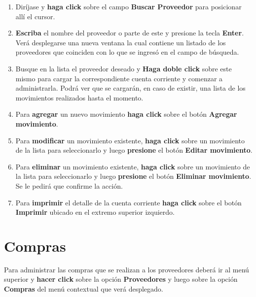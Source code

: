 \documentclass{book}
\begin{document}
\begin{enumerate}
	\itemsep=8pt \topsep=0pt \partopsep=0pt \parskip=0pt \parsep=0pt
	
	\item Diríjase y \textbf{haga click} sobre el campo \textbf{Buscar Proveedor} para posicionar allí el cursor.

	\item \textbf{Escriba} el nombre del proveedor o parte de este y presione la tecla \textbf{Enter}. Verá desplegarse una nueva ventana la cual contiene un listado de los proveedores que coinciden con lo que se ingresó en el campo de búsqueda.

	\item Busque en la lista el proveedor deseado y \textbf{Haga doble click} sobre este mismo para cargar la correspondiente cuenta corriente y comenzar a administrarla. Podrá ver que se cargarán, en caso de existir, una lista de los movimientos realizados hasta el momento.

	\item Para \textbf{agregar} un nuevo movimiento \textbf{haga click} sobre el botón \textbf{Agregar movimiento}.

	\item Para \textbf{modificar} un movimiento existente, \textbf{haga click} sobre un movimiento de la lista para seleccionarlo y luego \textbf{presione} el botón \textbf{Editar movimiento}.

	\item Para \textbf{eliminar} un movimiento existente, \textbf{haga click} sobre un movimiento de la lista para seleccionarlo y luego \textbf{presione} el botón \textbf{Eliminar movimiento}. Se le pedirá que confirme la acción.

	\item Para \textbf{imprimir} el detalle de la cuenta corriente \textbf{haga click} sobre el botón \textbf{Imprimir} ubicado en el extremo superior izquierdo.

\end{enumerate}
\medskip


\section{Compras}

Para administrar las compras que se realizan a los proveedores deberá ir al menú superior y \textbf{hacer click} sobre la opción \textbf{Proveedores} y luego sobre la opción \textbf{Compras} del menú contextual que verá desplegado.
\bigskip
\end{document}
